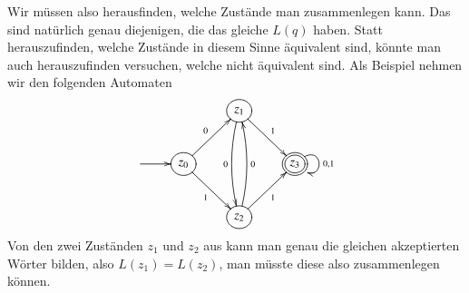 Wir müssen also herausfinden, welche Zustände man zusammenlegen
kann.
Das sind natürlich genau diejenigen, die das gleiche $L(q)$
haben.
Statt herauszufinden, welche Zustände in diesem Sinne äquivalent
sind, könnte man auch herauszufinden versuchen, welche nicht äquivalent
sind.
Als Beispiel nehmen wir den folgenden Automaten
\[
\entrymodifiers={++[o][F]}
\xymatrix{
*+\txt{}
	&*+\txt{}
		&{z_1}\ar@/_/[dd]_{0} \ar[dr]^{1}
\\
*+\txt{} \ar[r]
	&{z_0}\ar[ur]^{0} \ar[dr]_1
		&*+\txt{}
			&*++[o][F=]{z_3}\ar@(ur,dr)^{0,1}
\\
*+\txt{}
	&*+\txt{}
		&{z_2} \ar@/_/[uu]_{0} \ar[ur]_{1}
}
\]
Von den zwei Zuständen $z_1$ und $z_2$ aus kann man genau die gleichen
akzeptierten Wörter bilden, also $L(z_1)=L(z_2)$, man müsste diese
also zusammenlegen können.

